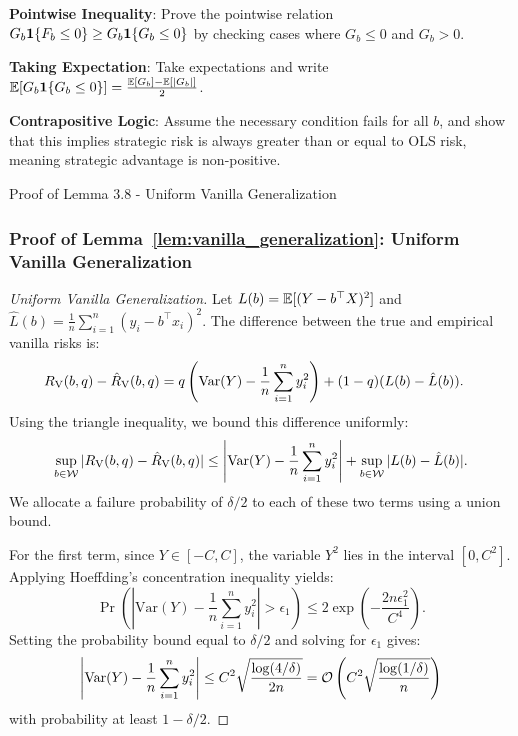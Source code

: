 \begin{guideblock}
\item \textbf{Pointwise Inequality}: Prove the pointwise relation $G_b \mathbf{1}\{F_b \le 0\} \ge G_b \mathbf{1}\{G_b \le 0\}$ by checking cases where $G_b \le 0$ and $G_b > 0$.
\item \textbf{Taking Expectation}: Take expectations and write $\mathbb{E}[G_b \mathbf{1}\{G_b \le 0\}] = \frac{\mathbb{E}[G_b] - \mathbb{E}[|G_b|]}{2}$.
\item \textbf{Contrapositive Logic}: Assume the necessary condition fails for all $b$, and show that this implies strategic risk is always greater than or equal to OLS risk, meaning strategic advantage is non-positive.
\end{guideblock}


\begin{sourceblock}{Proof of Lemma 3.8 - Uniform Vanilla Generalization}
\subsubsection*{Proof of Lemma~\ref{lem:vanilla_generalization}: Uniform Vanilla Generalization}
\label{app:proof_vanilla_generalization}
\begin{proof}[Uniform Vanilla Generalization]
Let $L(b) = \mathbb{E}[(Y - b^\top X)^2]$ and $\hat{L}(b) = \frac{1}{n}\sum_{i=1}^n (y_i - b^\top x_i)^2$. The difference between the true and empirical vanilla risks is:
\begin{align}
    R_{\mathrm{V}}(b, q) - \hat{R}_{\mathrm{V}}(b, q) &= q\left( \mathrm{Var}(Y) - \frac{1}{n}\sum_{i=1}^n y_i^2 \right) + (1 - q)(L(b) - \hat{L}(b)).
\end{align}
Using the triangle inequality, we bound this difference uniformly:
\begin{equation}
    \sup_{b \in \mathcal{W}} |R_{\mathrm{V}}(b, q) - \hat{R}_{\mathrm{V}}(b, q)| \le \left| \mathrm{Var}(Y) - \frac{1}{n}\sum_{i=1}^n y_i^2 \right| + \sup_{b \in \mathcal{W}} |L(b) - \hat{L}(b)|.
\end{equation}
We allocate a failure probability of $\delta/2$ to each of these two terms using a union bound.

For the first term, since $Y \in [-C, C]$, the variable $Y^2$ lies in the interval $[0, C^2]$. Applying Hoeffding's concentration inequality yields:
\begin{equation}
    \Pr\left( \left| \mathrm{Var}(Y) - \frac{1}{n}\sum_{i=1}^n y_i^2 \right| > \epsilon_1 \right) \le 2\exp\left( - \frac{2n \epsilon_1^2}{C^4} \right).
\end{equation}
Setting the probability bound equal to $\delta/2$ and solving for $\epsilon_1$ gives:
\begin{equation}
    \left| \mathrm{Var}(Y) - \frac{1}{n}\sum_{i=1}^n y_i^2 \right| \le C^2 \sqrt{\frac{\log(4/\delta)}{2n}} = \mathcal{O}\left( C^2 \sqrt{\frac{\log(1/\delta)}{n}} \right)
\end{equation}
with probability at least $1 - \delta/2$.


\end{proof}
\end{sourceblock}
